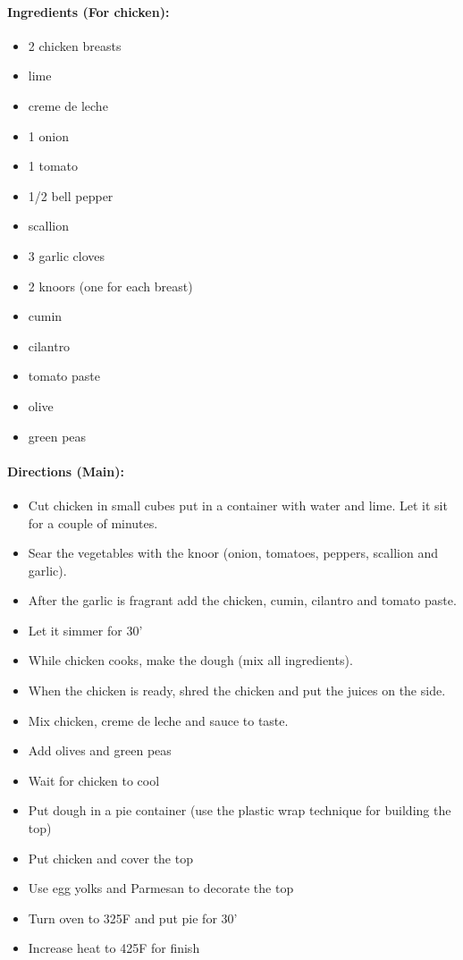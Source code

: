 \documentclass{article}
\begin{document}
\paragraph{Ingredients (For chicken):}
\begin{itemize}
    \item 2 chicken breasts
    \item lime
    \item creme de leche
    \item 1 onion
    \item 1 tomato
    \item 1/2 bell pepper
    \item scallion
    \item 3 garlic cloves
    \item 2 knoors (one for each breast)
    \item cumin
    \item cilantro
    \item tomato paste
    \item olive
    \item green peas
\end{itemize}  

\paragraph{Directions (Main):}
\begin{itemize}
    \item Cut chicken in small cubes put in a container with water and lime. Let it sit for a couple of minutes.
    \item Sear the vegetables with the knoor (onion, tomatoes, peppers, scallion and garlic).
    \item After the garlic is fragrant add the chicken, cumin, cilantro and tomato paste.
    \item Let it simmer for 30'
    \item While chicken cooks, make the dough (mix all ingredients).
    \item When the chicken is ready, shred the chicken and put the juices on the side.
    \item Mix chicken, creme de leche and sauce to taste.
    \item Add olives and green peas
    \item Wait for chicken to cool
    \item Put dough in a pie container (use the plastic wrap technique for building the top)
    \item Put chicken and cover the top
    \item Use egg yolks and Parmesan to decorate the top
    \item Turn oven to 325F and put pie for 30'
    \item Increase heat to 425F for finish
\end{itemize} 
\end{document}
